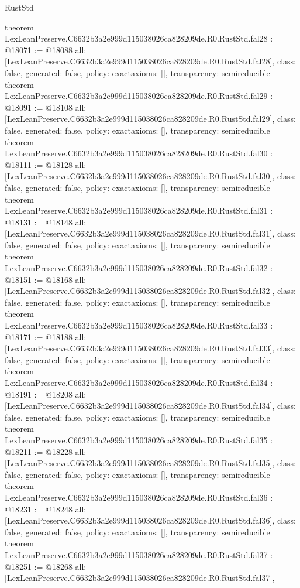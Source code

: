 \begin{lexlean}{RustStd}
\begin{coremodule}
{}
theorem LexLeanPreserve.C6632b3a2e999d115038026ca828209de.R0.RustStd.fal28 : @18071 := @18088 {
  all: [LexLeanPreserve.C6632b3a2e999d115038026ca828209de.R0.RustStd.fal28],
  class: false,
  generated: false,
  policy: exact{axioms: []},
  transparency: semireducible
}
theorem LexLeanPreserve.C6632b3a2e999d115038026ca828209de.R0.RustStd.fal29 : @18091 := @18108 {
  all: [LexLeanPreserve.C6632b3a2e999d115038026ca828209de.R0.RustStd.fal29],
  class: false,
  generated: false,
  policy: exact{axioms: []},
  transparency: semireducible
}
theorem LexLeanPreserve.C6632b3a2e999d115038026ca828209de.R0.RustStd.fal30 : @18111 := @18128 {
  all: [LexLeanPreserve.C6632b3a2e999d115038026ca828209de.R0.RustStd.fal30],
  class: false,
  generated: false,
  policy: exact{axioms: []},
  transparency: semireducible
}
theorem LexLeanPreserve.C6632b3a2e999d115038026ca828209de.R0.RustStd.fal31 : @18131 := @18148 {
  all: [LexLeanPreserve.C6632b3a2e999d115038026ca828209de.R0.RustStd.fal31],
  class: false,
  generated: false,
  policy: exact{axioms: []},
  transparency: semireducible
}
theorem LexLeanPreserve.C6632b3a2e999d115038026ca828209de.R0.RustStd.fal32 : @18151 := @18168 {
  all: [LexLeanPreserve.C6632b3a2e999d115038026ca828209de.R0.RustStd.fal32],
  class: false,
  generated: false,
  policy: exact{axioms: []},
  transparency: semireducible
}
theorem LexLeanPreserve.C6632b3a2e999d115038026ca828209de.R0.RustStd.fal33 : @18171 := @18188 {
  all: [LexLeanPreserve.C6632b3a2e999d115038026ca828209de.R0.RustStd.fal33],
  class: false,
  generated: false,
  policy: exact{axioms: []},
  transparency: semireducible
}
theorem LexLeanPreserve.C6632b3a2e999d115038026ca828209de.R0.RustStd.fal34 : @18191 := @18208 {
  all: [LexLeanPreserve.C6632b3a2e999d115038026ca828209de.R0.RustStd.fal34],
  class: false,
  generated: false,
  policy: exact{axioms: []},
  transparency: semireducible
}
theorem LexLeanPreserve.C6632b3a2e999d115038026ca828209de.R0.RustStd.fal35 : @18211 := @18228 {
  all: [LexLeanPreserve.C6632b3a2e999d115038026ca828209de.R0.RustStd.fal35],
  class: false,
  generated: false,
  policy: exact{axioms: []},
  transparency: semireducible
}
theorem LexLeanPreserve.C6632b3a2e999d115038026ca828209de.R0.RustStd.fal36 : @18231 := @18248 {
  all: [LexLeanPreserve.C6632b3a2e999d115038026ca828209de.R0.RustStd.fal36],
  class: false,
  generated: false,
  policy: exact{axioms: []},
  transparency: semireducible
}
theorem LexLeanPreserve.C6632b3a2e999d115038026ca828209de.R0.RustStd.fal37 : @18251 := @18268 {
  all: [LexLeanPreserve.C6632b3a2e999d115038026ca828209de.R0.RustStd.fal37],
}
\end{coremodule}
\end{lexlean}
